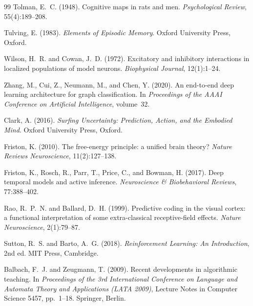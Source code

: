 \documentclass[12pt, oneside]{book}
\theoremstyle{flyxion}
\theoremstyle{definition}
\begin{document}
\begin{thebibliography}{99}
Tolman, E.~C. (1948).
\newblock Cognitive maps in rats and men.
\newblock \textit{Psychological Review}, 55(4):189--208.

Tulving, E. (1983).
\newblock \textit{Elements of Episodic Memory}.
\newblock Oxford University Press, Oxford.

Wilson, H.~R. and Cowan, J.~D. (1972).
\newblock Excitatory and inhibitory interactions in localized populations
  of model neurons.
\newblock \textit{Biophysical Journal}, 12(1):1--24.

Zhang, M., Cui, Z., Neumann, M., and Chen, Y. (2020).
\newblock An end-to-end deep learning architecture for graph classification.
\newblock In \textit{Proceedings of the AAAI Conference on Artificial
  Intelligence}, volume~32.


Clark, A. (2016).
\newblock \textit{Surfing Uncertainty: Prediction, Action, and the Embodied
  Mind}.
\newblock Oxford University Press, Oxford.

Friston, K. (2010).
\newblock The free-energy principle: a unified brain theory?
\newblock \textit{Nature Reviews Neuroscience}, 11(2):127--138.

Friston, K., Rosch, R., Parr, T., Price, C., and Bowman, H. (2017).
\newblock Deep temporal models and active inference.
\newblock \textit{Neuroscience \& Biobehavioral Reviews}, 77:388--402.

Rao, R.~P.~N. and Ballard, D.~H. (1999).
\newblock Predictive coding in the visual cortex: a functional interpretation
  of some extra-classical receptive-field effects.
\newblock \textit{Nature Neuroscience}, 2(1):79--87.

Sutton, R.~S. and Barto, A.~G. (2018).
\newblock \textit{Reinforcement Learning: An Introduction}, 2nd ed.
\newblock MIT Press, Cambridge.


Balbach, F.~J. and Zeugmann, T. (2009).
\newblock Recent developments in algorithmic teaching.
\newblock In \textit{Proceedings of the 3rd International Conference on
  Language and Automata Theory and Applications (LATA 2009)},
  Lecture Notes in Computer Science 5457, pp.\ 1--18. Springer, Berlin.


\end{thebibliography}
\end{document}
